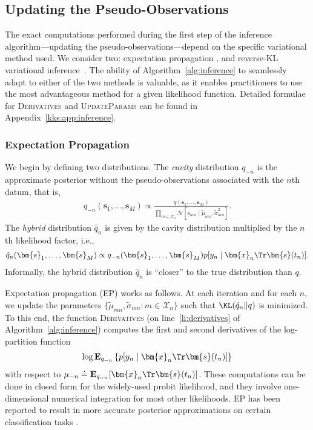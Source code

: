 \subsection{Updating the Pseudo-Observations}
\label{kks:sec:inf-pseudo-obs}

The exact computations performed during the first step of the inference algorithm---updating the pseudo-observations---depend on the specific variational method used.
We consider two: expectation propagation \citep{minka2001family}, and reverse-KL variational inference~\citep{blei2017variational}.
The ability of Algorithm~\ref{alg:inference} to seamlessly adapt to either of the two methods is valuable, as it enables practitioners to use the most advantageous method for a given likelihood function.
Detailed formulae for \textsc{Derivatives} and \textsc{UpdateParams} can be found in Appendix~\ref{kks:app:inference}.

\subsubsection{Expectation Propagation}

We begin by defining two distributions.
The \emph{cavity} distribution $q_{-n}$ is the approximate posterior without the pseudo-observations associated with the $n$th datum, that is,
\begin{align*}
q_{-n}(\bm{s}_1, \ldots, \bm{s}_M) \propto \frac{q(\bm{s}_1, \ldots, \bm{s}_M)}{
        \prod_{m \in \mathcal{X}_n} \mathcal{N}[s_{mn} \mid \tilde{\mu}_{mn}, \tilde{\sigma}^2_{mn}]}.
\end{align*}
The \emph{hybrid} distribution $\hat{q}_n$ is given by the cavity distribution multiplied by the $n$th likelihood factor, i.e.,
\begin{align*}
\hat{q}_n(\bm{s}_1, \ldots, \bm{s}_M) \propto q_{-n}(\bm{s}_1, \ldots, \bm{s}_M) p[y_n \mid \bm{x}_n\Tr \bm{s}(t_n)].
\end{align*}
Informally, the hybrid distribution $\hat{q}_n$ is ``closer'' to the true distribution than $q$.

Expectation propagation (EP) works as follows. At each iteration and for each $n$, we update the parameters $\{ \tilde{\mu}_{mn}, \tilde{\sigma}_{mn} : m \in \mathcal{X}_n \}$ such that $\KL( \hat{q}_n \Vert q )$ is minimized.
To this end, the function \textsc{Derivatives} (on line~\ref{li:derivatives} of Algorithm~\ref{alg:inference}) computes the first and second derivatives of the log-partition function
\begin{align}
\label{kks:eq:logpart}
\log \mathbf{E}_{q_{-n}} \left\{ p[y_n \mid \bm{x}_n\Tr \bm{s}(t_n)] \right\}
\end{align}
with respect to ${\mu}_{-n} \doteq \mathbf{E}_{q_{-n}}[\bm{x}_n\Tr \bm{s}(t_n)]$.
These computations can be done in closed form for the widely-used probit likelihood, and they involve one-dimensional numerical integration for most other likelihoods.
EP has been reported to result in more accurate posterior approximations on certain classification tasks \citep{nickisch2008approximations}.

